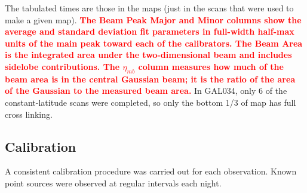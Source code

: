 \documentclass[twocolumn]{aastex62}
\def\edit#1{{\textcolor{red}{\textbf{#1}}}}
\begin{document}
\begin{table}[htp]
\par
The tabulated times are those in the maps (just in the scans that were used to
make a given map).
\edit{The Beam Peak Major and Minor columns show the average and standard
deviation fit parameters in full-width half-max units of the main peak toward
each of the calibrators.  The Beam Area is the integrated area under the
two-dimensional beam and includes sidelobe contributions.  The $\eta_{mb}$
column measures how much of the beam area is in the central Gaussian beam; it
is the ratio of the area of the Gaussian to the measured beam area.}
In GAL034, only 6 of the constant-latitude scans were completed, so only the bottom
1/3 of map has full cross linking.
\end{table}

\subsection{Calibration}


A consistent calibration procedure was carried out for each observation.
Known point sources were observed at regular intervals each night.
\end{document}
